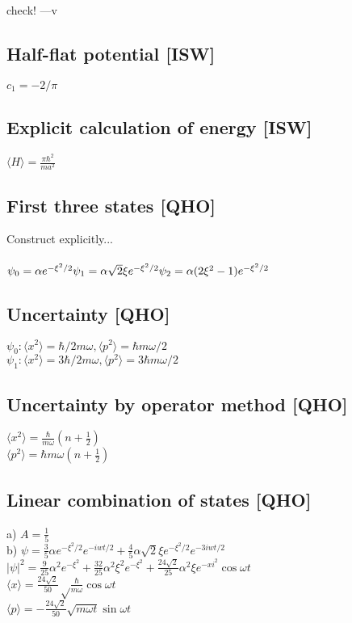 \documentclass{article}
\newcommand{\half}{\frac{1}{2}}
\newcommand{\<}{\langle}
\renewcommand{\>}{\rangle}
\begin{document}
check! ---v

\subsection{Half-flat potential [ISW]}

$c_1 = -2/\pi$

\subsection{Explicit calculation of energy [ISW]}

$\<H\> = \frac{\pi \hbar^2}{ma^2}$

\subsection{First three states [QHO]}

Construct explicitly...
\\ \\
$\psi_0 = \alpha e^{-\xi^2/2} \\
\psi_1 = \alpha\sqrt 2 \xi e^{-\xi^2/2} \\
\psi_2 = \alpha(2\xi^2 - 1) e^{-\xi^2/2}$

\subsection{Uncertainty [QHO]}

$\psi_0: \<x^2\> = \hbar/2m\omega, \<p^2\> = \hbar m \omega / 2$ \\
$\psi_1: \<x^2\> = 3\hbar/2m\omega, \<p^2\> = 3 \hbar m \omega / 2$

\subsection{Uncertainty by operator method [QHO]}

$\<x^2\> = \frac{\hbar}{m\omega} (n+\half)$ \\
$\<p^2\> = \hbar m \omega (n + \half)$

\subsection{Linear combination of states [QHO]}

a) $A = \frac{1}{5}$ \\
b) $\psi = \frac{3}{5} \alpha e^{-\xi^2/2}e^{-iwt/2} + \frac{4}{5} \alpha \sqrt 2 \xi e^{-\xi^2/2}e^{-3iwt/2}$ \\
$|\psi|^2 = \frac{9}{25} \alpha^2 e^{-\xi^2} + \frac{32}{25} \alpha^2 \xi^2 e^{-\xi^2} + \frac{24\sqrt 2}{25}\alpha^2\xi e^{-xi^2} \cos\omega t$ \\
$\<x\> = \frac{24\sqrt 2}{50} \sqrt\frac{\hbar}{m\omega} \cos\omega t$ \\
$\<p\> = -\frac{24\sqrt 2}{50}\sqrt{m\omega t} \sin\omega t$
\end{document}
